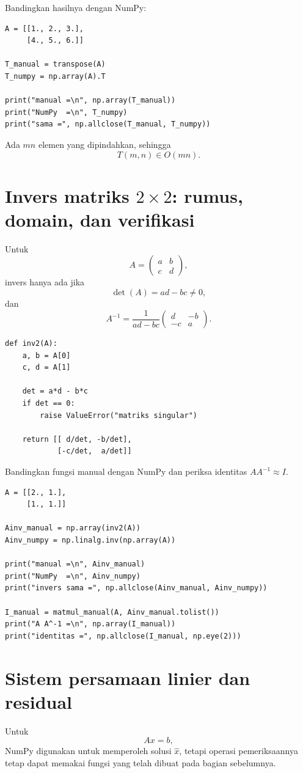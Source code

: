 \documentclass[11pt,a4paper]{report}
\begin{document}
Bandingkan hasilnya dengan NumPy:
\begin{lstlisting}
A = [[1., 2., 3.],
     [4., 5., 6.]]

T_manual = transpose(A)
T_numpy = np.array(A).T

print("manual =\n", np.array(T_manual))
print("NumPy  =\n", T_numpy)
print("sama =", np.allclose(T_manual, T_numpy))
\end{lstlisting}

Ada $mn$ elemen yang dipindahkan, sehingga
\[
T(m,n)\in O(mn).
\]

\section{Invers matriks $2\times2$: rumus, domain, dan verifikasi}
Untuk
\[
A=\begin{pmatrix}a&b\\c&d\end{pmatrix},
\]
invers hanya ada jika
\[
\det(A)=ad-bc\neq0,
\]
dan
\[
A^{-1}=\frac{1}{ad-bc}
\begin{pmatrix}d&-b\\-c&a\end{pmatrix}.
\]

\begin{lstlisting}
def inv2(A):
    a, b = A[0]
    c, d = A[1]

    det = a*d - b*c
    if det == 0:
        raise ValueError("matriks singular")

    return [[ d/det, -b/det],
            [-c/det,  a/det]]
\end{lstlisting}

Bandingkan fungsi manual dengan NumPy dan periksa identitas $AA^{-1}\approx I$.
\begin{lstlisting}
A = [[2., 1.],
     [1., 1.]]

Ainv_manual = np.array(inv2(A))
Ainv_numpy = np.linalg.inv(np.array(A))

print("manual =\n", Ainv_manual)
print("NumPy  =\n", Ainv_numpy)
print("invers sama =", np.allclose(Ainv_manual, Ainv_numpy))

I_manual = matmul_manual(A, Ainv_manual.tolist())
print("A A^-1 =\n", np.array(I_manual))
print("identitas =", np.allclose(I_manual, np.eye(2)))
\end{lstlisting}

\section{Sistem persamaan linier dan residual}
Untuk
\[
Ax=b,
\]
NumPy digunakan untuk memperoleh solusi $\hat{x}$, tetapi operasi pemeriksaannya tetap dapat memakai fungsi yang telah dibuat pada bagian sebelumnya.
\end{document}
